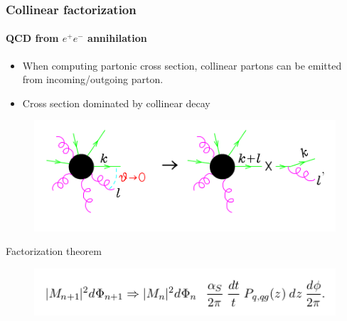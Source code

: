 \documentclass[aspectratio=43]{beamer}
\begin{document}
\begin{frame}

	\frametitle{Collinear factorization}
	\framesubtitle{QCD from $e^{+}e^{-}$ annihilation}
	
	\begin{itemize} 
		\item When computing partonic cross section, collinear partons can be emitted from incoming/outgoing parton.
		\item Cross section dominated by collinear decay
	\end{itemize}

	\begin{figure}
		\includegraphics[width = 7 cm]{plots/collinear_factorization.png}
	\end{figure}

	Factorization theorem 
	\begin{figure}
	\includegraphics[width = 8 cm]{plots/eq_factorization_theorem.png}
	\end{figure}
	
\end{frame}
\end{document}
